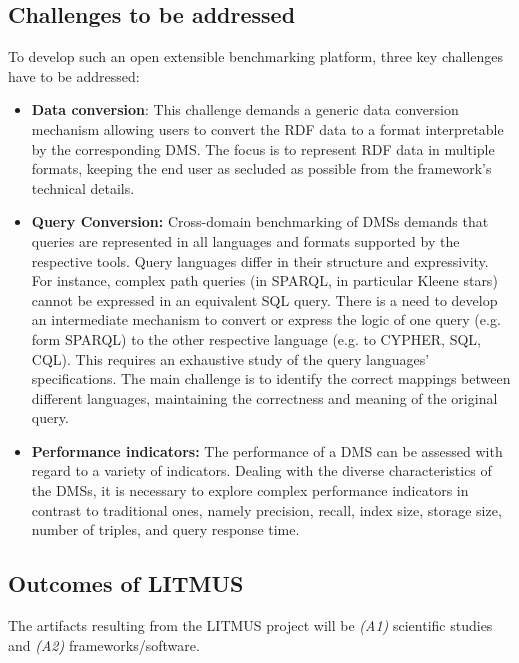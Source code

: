 \documentclass{llncs}
\begin{document}
    \subsection{Challenges to be addressed}\label{challenges}
        To develop such an open extensible benchmarking platform, three key challenges have to be addressed:
        \begin{itemize}[nosep]
            \item {} \textbf{Data conversion}: This challenge demands a generic data conversion mechanism allowing users to convert the RDF data to a format interpretable by the corresponding DMS.
            The focus is to represent RDF data in multiple formats, keeping the end user as secluded as possible from the framework's technical details. 
            \item {} \textbf{Query Conversion:} 
            Cross-domain benchmarking of DMSs demands that queries are represented in all languages and formats supported by the respective tools.
            Query languages differ in their structure and expressivity. %
            For instance, complex path queries (in SPARQL, in particular Kleene stars) cannot be expressed in an equivalent SQL query.
            There is a need to develop an intermediate mechanism to convert or express the logic of one query (e.g. form SPARQL) to the other respective language (e.g. to CYPHER, SQL, CQL).
            This requires an exhaustive study of the query languages' specifications.
            The main challenge is to identify the correct mappings between different languages, maintaining the correctness and meaning of the original query.
            \item {} \textbf{Performance indicators:} 
            The performance of a DMS can be assessed with regard to a variety of indicators.
            Dealing with the diverse characteristics of the DMSs, it is necessary to explore complex performance indicators in contrast to traditional ones, namely precision, recall, index size, storage size, number of triples, and query response time.
        \end{itemize}
    
    \subsection{Outcomes of LITMUS}
    \label{outcomes}
    The artifacts resulting from the LITMUS project will be \textit{(A1)} scientific studies and \textit{(A2)} frameworks/software. 
    
\end{document}
